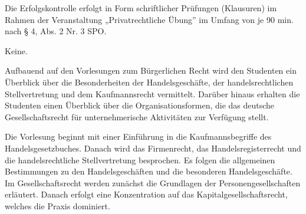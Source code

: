 \begin{course}

\setdoclanguagegerman
{}



\coursehead


\label{cour_4389.dp_997}


\begin{styleenv}
\begin{assessment}
Die Erfolgskontrolle erfolgt in Form schriftlicher Prüfungen (Klausuren) im Rahmen der Veranstaltung „Privatrechtliche Übung” im Umfang von je 90 min. nach § 4, Abs. 2 Nr. 3 SPO.


\end{assessment}

\begin{conditions}Keine.\end{conditions}


\end{styleenv}

\begin{learningoutcomes}
Aufbauend auf den Vorlesungen zum Bürgerlichen Recht wird den Studenten ein Überblick über die Besonderheiten der Handelsgeschäfte, der handelsrechtlichen Stellvertretung und dem Kaufmannsrecht vermittelt. Darüber hinaus erhalten die Studenten einen Überblick über die Organisationsformen, die das deutsche Gesellschaftsrecht für unternehmerische Aktivitäten zur Verfügung stellt.


\end{learningoutcomes}

\begin{content}
Die Vorlesung beginnt mit einer Einführung in die Kaufmannsbegriffe des Handelsgesetzbuches. Danach wird das Firmenrecht, das Handelsregisterrecht und die handelsrechtliche Stellvertretung besprochen. Es folgen die allgemeinen Bestimmungen zu den Handelsgeschäften und die besonderen Handelsgeschäfte. Im Gesellschaftsrecht werden zunächst die Grundlagen der Personengesellschaften erläutert. Danach erfolgt eine Konzentration auf das Kapitalgesellschaftsrecht, welches die Praxis dominiert.



\end{content}
\end{course}
